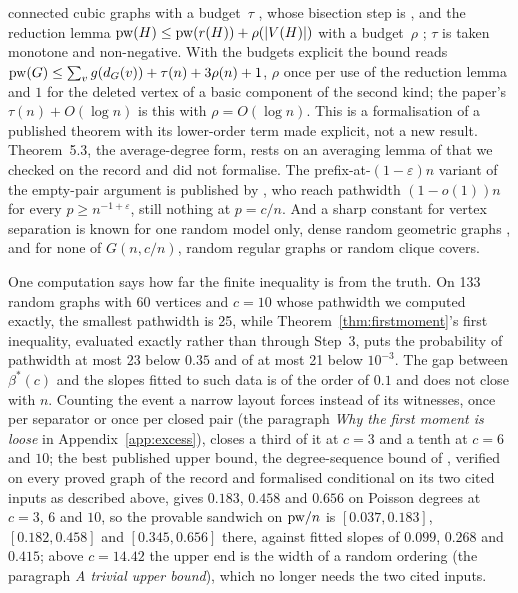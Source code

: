 connected cubic graphs with a budget~$\tau$ \citep[Theorem~5]{FominHoie2006},
whose bisection step is \citet{MonienPreis2006}, and the reduction lemma
$\mathrm{pw}(H)\le\mathrm{pw}(r(H))+\rho(|V(H)|)$ with a budget~$\rho$
\citep{KneisMolleRichterRossmanith2009}; $\tau$ is taken monotone and
non-negative. With the budgets explicit the bound reads
$\mathrm{pw}(G)\le\sum_v g(d_G(v))+\tau(n)+3\rho(n)+1$, $\rho$ once per use of the
reduction lemma and $1$ for the deleted vertex of a basic component of the
second kind; the paper's $\tau(n)+O(\log n)$ is this with $\rho=O(\log n)$.
This is a formalisation of a published theorem with its lower-order term
made explicit, not a new result. Theorem~5.3, the average-degree form,
rests on an averaging lemma of \citet{EdwardsFarr2012} that we checked on
the record and did not formalise.
The prefix-at-$(1-\varepsilon)n$ variant of the
empty-pair argument is published by \citet{CheungGirardet2020}, who reach
pathwidth $(1-o(1))n$ for every $p\ge n^{-1+\varepsilon}$, still nothing at
$p=c/n$. And a sharp constant for vertex separation is known for one random
model only, dense random geometric graphs \citep{DiazPenrosePetitSerna2001},
and for none of $G(n,c/n)$, random regular graphs or random clique covers.

One computation says how far the finite inequality is from the truth. On
133 random graphs with 60 vertices and $c=10$ whose pathwidth we computed
exactly, the smallest pathwidth is 25, while Theorem~\ref{thm:firstmoment}'s
first inequality, evaluated exactly rather than through Step~3, puts the
probability of pathwidth at most 23 below $0.35$ and of at most 21 below
$10^{-3}$. The gap between $\beta^{*}(c)$ and the slopes fitted to such data
is of the order of $0.1$ and does not close with $n$. Counting the event a
narrow layout forces instead of its witnesses, once per separator or once per
closed pair (the paragraph \emph{Why the first moment is loose} in
Appendix~\ref{app:excess}), closes a third of it at $c=3$ and a tenth at $c=6$
and $10$; the best published upper bound, the degree-sequence bound of
\citet[Corollary~5.2]{EdwardsMcDermid2015}, verified on every proved graph of
the record and formalised conditional on its two cited inputs as described
above, gives $0.183$, $0.458$ and $0.656$
on Poisson degrees at $c=3$, $6$ and $10$, so the provable sandwich on
$\mathrm{pw}/n$ is $[0.037,0.183]$, $[0.182,0.458]$ and $[0.345,0.656]$ there, against
fitted slopes of $0.099$, $0.268$ and $0.415$; above $c=14.42$ the upper end
is the width of a random ordering (the paragraph \emph{A trivial upper
bound}), which no longer needs the two cited inputs.
